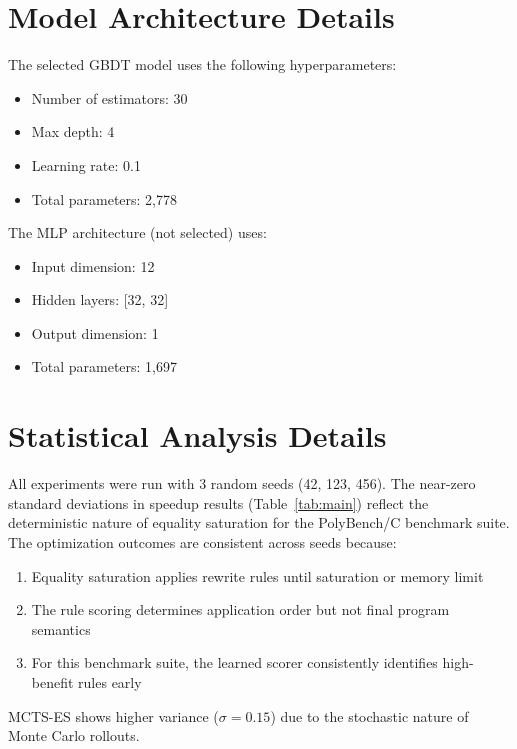 \documentclass{article}
\begin{document}
\section{Model Architecture Details}

The selected GBDT model uses the following hyperparameters:
\begin{itemize}
    \item Number of estimators: 30
    \item Max depth: 4
    \item Learning rate: 0.1
    \item Total parameters: 2,778
\end{itemize}

The MLP architecture (not selected) uses:
\begin{itemize}
    \item Input dimension: 12
    \item Hidden layers: [32, 32]
    \item Output dimension: 1
    \item Total parameters: 1,697
\end{itemize}

\section{Statistical Analysis Details}

All experiments were run with 3 random seeds (42, 123, 456). The near-zero standard deviations in speedup results (Table~\ref{tab:main}) reflect the deterministic nature of equality saturation for the PolyBench/C benchmark suite. The optimization outcomes are consistent across seeds because:
\begin{enumerate}
    \item Equality saturation applies rewrite rules until saturation or memory limit
    \item The rule scoring determines application order but not final program semantics
    \item For this benchmark suite, the learned scorer consistently identifies high-benefit rules early
\end{enumerate}

MCTS-ES shows higher variance ($\sigma = 0.15$) due to the stochastic nature of Monte Carlo rollouts.
\end{document}
